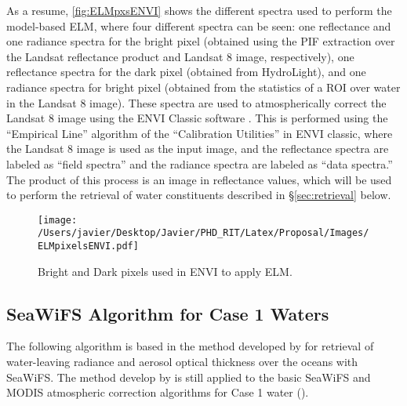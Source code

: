 As a resume, \autoref{fig:ELMpxsENVI} shows the different spectra used to perform the model-based ELM, where four different spectra can be seen: one reflectance and one radiance spectra for the bright pixel (obtained using the PIF extraction over the Landsat reflectance product and Landsat 8 image, respectively), one reflectance spectra for the dark pixel (obtained from HydroLight), and one radiance spectra for bright pixel (obtained from the statistics of a ROI over water in the Landsat 8 image). These spectra are used to atmospherically correct the Landsat 8 image using the ENVI Classic software \cite{ENVIUserGuide}. This is performed using the ``Empirical Line'' algorithm of the ``Calibration Utilities'' in ENVI classic, where the Landsat 8 image is used as the input image, and the reflectance spectra are labeled as ``field spectra'' and the radiance spectra are labeled as ``data spectra.'' The product of this process is an image in reflectance values, which will be used to perform the retrieval of water constituents described in \S\ref{sec:retrieval} below. 

\begin{figure}[!ht]
  \centering
  \texttt{[image: /Users/javier/Desktop/Javier/PHD\_RIT/Latex/Proposal/Images/ELMpixelsENVI.pdf]}
  \caption{Bright and Dark pixels used in ENVI to apply ELM. \label{fig:ELMpxsENVI} } 
\end{figure}


\subsection{SeaWiFS Algorithm for Case 1 Waters}
The following algorithm is based in the method developed by \cite{Gordon:1994} for retrieval of water-leaving radiance and aerosol optical thickness over the oceans with SeaWiFS. The method develop by \cite{Gordon:1994} is still applied to the basic SeaWiFS and MODIS atmospheric correction algorithms for Case 1 water (\cite{IOCCG:2010}).

